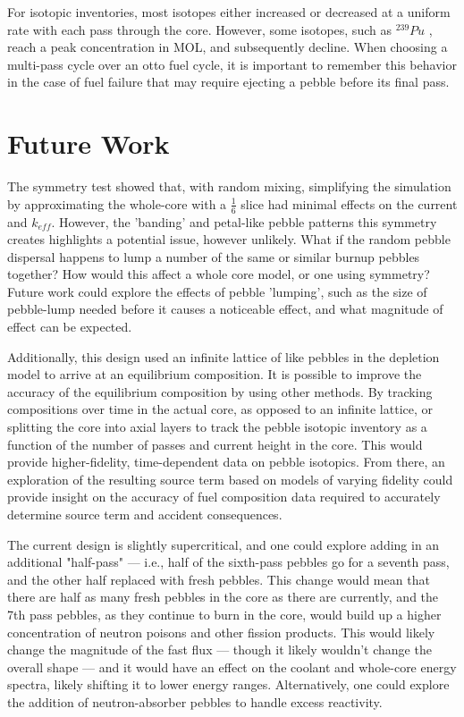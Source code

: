 For isotopic inventories, most isotopes either increased or decreased at a uniform rate with each pass through the core.  However, some isotopes, such as $^{239}Pu$ , reach a peak concentration in MOL, and subsequently decline.  When choosing a multi-pass cycle over an \acrfull{otto} fuel cycle, it is important to remember this behavior in the case of fuel failure that may require ejecting a pebble before its final pass.


\section{Future Work}

The symmetry test showed that, with random mixing, simplifying the simulation by approximating the whole-core with a $\frac{1}{6}$ slice had minimal effects on the current and $k_{eff}$.  However, the 'banding' and petal-like pebble patterns this symmetry creates highlights a potential issue, however unlikely.  What if the random pebble dispersal happens to lump a number of the same or similar burnup pebbles together?  How would this affect a whole core model, or one using symmetry?  Future work could explore the effects of pebble 'lumping', such as the size of pebble-lump needed before it causes a noticeable effect, and what magnitude of effect can be expected.

Additionally, this design used an infinite lattice of like pebbles in the depletion model to arrive at an equilibrium composition.  It is possible to improve the accuracy of the equilibrium composition by using other methods.  By tracking compositions over time in the actual core, as opposed to an infinite lattice, or splitting the core into axial layers to track the pebble isotopic inventory as a function of the number of passes and current height in the core.  This would provide higher-fidelity, time-dependent data on pebble isotopics.  From there, an exploration of the resulting source term based on models of varying fidelity could provide insight on the accuracy of fuel composition data required to accurately determine source term and accident consequences.

The current design is slightly supercritical, and one could explore adding in an additional "half-pass" --- i.e., half of the sixth-pass pebbles go for a seventh pass, and the other half replaced with fresh pebbles.  This change would mean that there are half as many fresh pebbles in the core as there are currently, and the 7th pass pebbles, as they continue to burn in the core, would build up a higher concentration of neutron poisons and other fission products.  This would likely change the magnitude of the fast flux --- though it likely wouldn't change the overall shape --- and it would have an effect on the coolant and whole-core energy spectra, likely shifting it to lower energy ranges.  Alternatively, one could explore the addition of neutron-absorber pebbles to handle excess reactivity.


